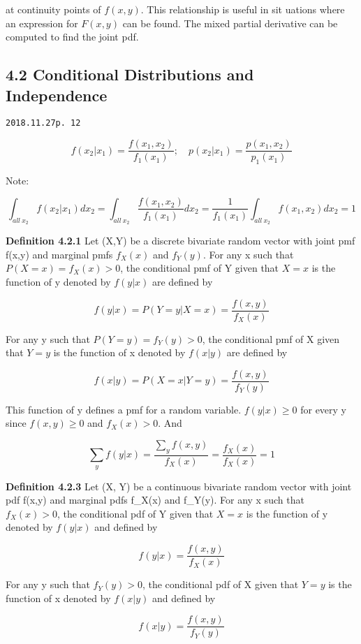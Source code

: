 \documentclass[]{tufte-book}
\begin{document}
at continuity points of \(f(x, y)\). This relationship is useful in sit
uations where an expression for \(F(x,y)\) can be found. The mixed
partial derivative can be computed to find the joint pdf.

\hypertarget{conditional-distributions-and-independence}{%
\subsection{4.2 Conditional Distributions and
Independence}\label{conditional-distributions-and-independence}}

\texttt{2018.11.27\textasciigrave{}\textasciigrave{}p.\ 12}

\[f(x_2|x_1)=\frac{f(x_1,x_2)}{f_1(x_1)};\quad p(x_2|x_1)=\frac{p(x_1,x_2)}{p_1(x_1)}\]

Note:

\[\int_{all\ x_2} f(x_2|x_1)dx_2=\int_{all\ x_2}\frac{f(x_1,x_2)}{f_1(x_1)}dx_2=\frac1{f_1(x_1)}\int_{all\ x_2}{f(x_1,x_2)}dx_2=1\]

\textbf{Definition 4.2.1} Let (X,Y) be a discrete bivariate random
vector with joint pmf f(x,y) and marginal pmfs \(f_X(x)\) and
\(f_Y(y)\). For any x such that \(P(X=x)=f_X(x)>0\), the conditional pmf
of Y given that \(X=x\) is the function of y denoted by \(f(y|x)\) are
defined by

\[f(y|x)=P(Y=y|X=x)=\frac{f(x,y)}{f_X(x)}\]

For any y such that \(P(Y=y)=f_Y(y)>0\), the conditional pmf of X given
that \(Y=y\) is the function of x denoted by \(f(x|y)\) are defined by

\[f(x|y)=P(X=x|Y=y)=\frac{f(x,y)}{f_Y(y)}\]

This function of y defines a pmf for a random variable. \(f(y|x)\ge0\)
for every y since \(f(x,y)\ge0\) and \(f_X(x)>0\). And

\[\sum_yf(y|x)=\frac{\sum_yf(x,y)}{f_X(x)}=\frac{f_X(x)}{f_X(x)}=1\]

\textbf{Definition 4.2.3} Let (X, Y) be a continuous bivariate random
vector with joint pdf f(x,y) and marginal pdfs f\_X(x) and f\_Y(y). For
any x such that \(f_X(x)>0\), the conditional pdf of Y given that
\(X=x\) is the function of y denoted by \(f(y|x)\) and defined by

\[f(y|x)=\frac{f(x,y)}{f_X(x)}\]

For any y such that \(f_Y(y)>0\), the conditional pdf of X given that
\(Y=y\) is the function of x denoted by \(f(x|y)\) and defined by

\[f(x|y)=\frac{f(x,y)}{f_Y(y)}\]
\end{document}
